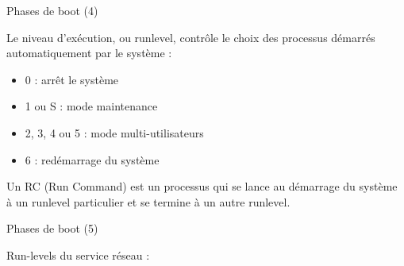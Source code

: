 \documentclass[12pt, t]{beamer}
\newcommand{\bi}{\begin{itemize}}
\newcommand{\ei}{\end{itemize}}
\begin{document}
\begin{frame}{Phases de boot (4)}

    \vspace{15pt}
    Le niveau d'exécution, ou runlevel, contrôle le choix des processus
    démarrés automatiquement par le système :

    \vspace{8pt}
    \bi
    \itemsep8pt
    \item 0 : arrêt le système
    \item 1 ou S : mode maintenance
    \item 2, 3, 4 ou 5 : mode multi-utilisateurs
    \item 6 : redémarrage du système
    \ei

    {
        \vspace{8pt}
        Un RC (Run Command) est un processus qui se lance au démarrage du système
        à un runlevel particulier et se termine à un autre runlevel.
    }

\end{frame}


\begin{frame}{Phases de boot (5)}

    \vspace{30pt}
    Run-levels du service réseau :
    \vspace{10pt}
    \lstrc

\end{frame}
\end{document}
